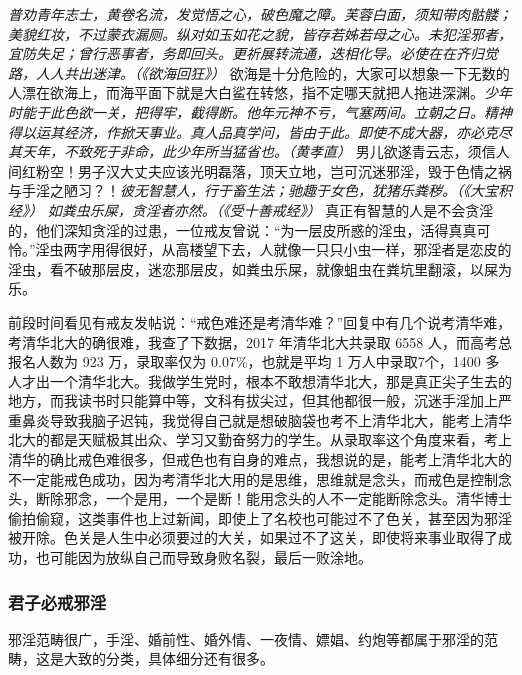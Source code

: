 \textit{普劝青年志士，黄卷名流，发觉悟之心，破色魔之障。芙蓉白面，须知带肉骷髅；美貌红妆，不过蒙衣漏厕。纵对如玉如花之貌，皆存若姊若母之心。未犯淫邪者，宜防失足；曾行恶事者，务即回头。更祈展转流通，迭相化导。必使在在齐归觉路，人人共出迷津。（《欲海回狂》）} 欲海是十分危险的，大家可以想象一下无数的人漂在欲海上，而海平面下就是大白鲨在转悠，指不定哪天就把人拖进深渊。\textit{少年时能于此色欲一关，把得牢，截得断。他年元神不亏，气塞两间。立朝之日。精神得以运其经济，作掀天事业。真人品真学问，皆由于此。即使不成大器，亦必克尽其天年，不致死于非命，此少年所当猛省也。（黄孝直）} 男儿欲遂青云志，须信人间红粉空！男子汉大丈夫应该光明磊落，顶天立地，岂可沉迷邪淫，毁于色情之祸与手淫之陋习？！\textit{彼无智慧人，行于畜生法；驰趣于女色，犹猪乐粪秽。（《大宝积经》）} \textit{如粪虫乐屎，贪淫者亦然。（《受十善戒经》）} 真正有智慧的人是不会贪淫的，他们深知贪淫的过患，一位戒友曾说：“为一层皮所惑的淫虫，活得真真可怜。”淫虫两字用得很好，从高楼望下去，人就像一只只小虫一样，邪淫者是恋皮的淫虫，看不破那层皮，迷恋那层皮，如粪虫乐屎，就像蛆虫在粪坑里翻滚，以屎为乐。

前段时间看见有戒友发帖说：“戒色难还是考清华难？”回复中有几个说考清华难，考清华北大的确很难，我查了下数据，2017 年清华北大共录取 6558 人，而高考总报名人数为 923 万，录取率仅为 0.07\%，也就是平均 1 万人中录取7个，1400 多人才出一个清华北大。我做学生党时，根本不敢想清华北大，那是真正尖子生去的地方，而我读书时只能算中等，文科有拔尖过，但其他都很一般，沉迷手淫加上严重鼻炎导致我脑子迟钝，我觉得自己就是想破脑袋也考不上清华北大，能考上清华北大的都是天赋极其出众、学习又勤奋努力的学生。从录取率这个角度来看，考上清华的确比戒色难很多，但戒色也有自身的难点，我想说的是，能考上清华北大的不一定能戒色成功，因为考清华北大用的是思维，思维就是念头，而戒色是控制念头，断除邪念，一个是用，一个是断！能用念头的人不一定能断除念头。清华博士偷拍偷窥，这类事件也上过新闻，即使上了名校也可能过不了色关，甚至因为邪淫被开除。色关是人生中必须要过的大关，如果过不了这关，即使将来事业取得了成功，也可能因为放纵自己而导致身败名裂，最后一败涂地。

\subsubsection{君子必戒邪淫}

邪淫范畴很广，手淫、婚前性、婚外情、一夜情、嫖娼、约炮等都属于邪淫的范畴，这是大致的分类，具体细分还有很多。

